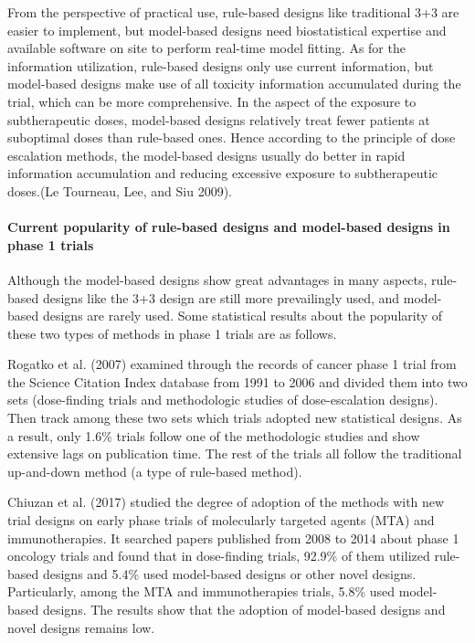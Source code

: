 \documentclass[
]{article}
\begin{document}
From the perspective of practical use, rule-based designs like
traditional 3+3 are easier to implement, but model-based designs need
biostatistical expertise and available software on site to perform
real-time model fitting. As for the information utilization, rule-based
designs only use current information, but model-based designs make use
of all toxicity information accumulated during the trial, which can be
more comprehensive. In the aspect of the exposure to subtherapeutic
doses, model-based designs relatively treat fewer patients at suboptimal
doses than rule-based ones. Hence according to the principle of dose
escalation methods, the model-based designs usually do better in rapid
information accumulation and reducing excessive exposure to
subtherapeutic doses.(Le Tourneau, Lee, and Siu 2009).

\hypertarget{current-popularity-of-rule-based-designs-and-model-based-designs-in-phase-1-trials}{%
\paragraph{Current popularity of rule-based designs and model-based
designs in phase 1
trials}\label{current-popularity-of-rule-based-designs-and-model-based-designs-in-phase-1-trials}}

Although the model-based designs show great advantages in many aspects,
rule-based designs like the 3+3 design are still more prevailingly used,
and model-based designs are rarely used. Some statistical results about
the popularity of these two types of methods in phase 1 trials are as
follows.

Rogatko et al. (2007) examined through the records of cancer phase 1
trial from the Science Citation Index database from 1991 to 2006 and
divided them into two sets (dose-finding trials and methodologic studies
of dose-escalation designs). Then track among these two sets which
trials adopted new statistical designs. As a result, only 1.6\% trials
follow one of the methodologic studies and show extensive lags on
publication time. The rest of the trials all follow the traditional
up-and-down method (a type of rule-based method).

Chiuzan et al. (2017) studied the degree of adoption of the methods with
new trial designs on early phase trials of molecularly targeted agents
(MTA) and immunotherapies. It searched papers published from 2008 to
2014 about phase 1 oncology trials and found that in dose-finding
trials, 92.9\% of them utilized rule-based designs and 5.4\% used
model-based designs or other novel designs. Particularly, among the MTA
and immunotherapies trials, 5.8\% used model-based designs. The results
show that the adoption of model-based designs and novel designs remains
low.
\end{document}
